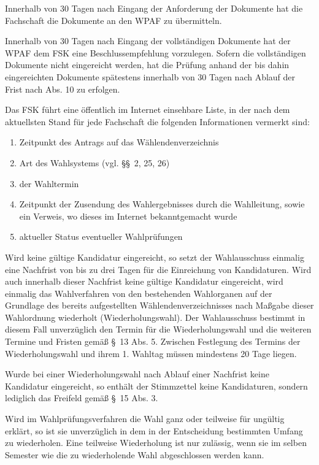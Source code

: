 \documentclass[%
draft,%
multilinesections%
]{fswo}
\begin{document}
\begin{contract}
Innerhalb von 30 Tagen nach Eingang der Anforderung der Dokumente hat die Fachschaft die Dokumente an den WPAF zu übermitteln.

Innerhalb von 30 Tagen nach Eingang der vollständigen Dokumente hat der WPAF dem FSK eine Beschlussempfehlung vorzulegen.
Sofern die vollständigen Dokumente nicht eingereicht werden, hat die Prüfung anhand der bis dahin eingereichten Dokumente spätestens innerhalb von 30 Tagen nach Ablauf der Frist nach Abs. 10 zu erfolgen.

Das FSK führt eine öffentlich im Internet einsehbare Liste, in der nach dem aktuellsten Stand für jede Fachschaft die folgenden Informationen vermerkt sind:
\begin{enumerate}
\item Zeitpunkt des Antrags auf das Wählendenverzeichnis
\item Art des Wahlsystems (vgl. \S\S~2, 25, 26) %
\item der Wahltermin
\item Zeitpunkt der Zusendung des Wahlergebnisses durch die Wahlleitung, sowie ein Verweis, wo dieses im Internet bekanntgemacht wurde
\item aktueller Status eventueller Wahlprüfungen
\end{enumerate}

Wird keine gültige Kandidatur eingereicht, so setzt der Wahlausschuss einmalig eine Nachfrist von bis zu drei Tagen für die Einreichung von Kandidaturen.
Wird auch innerhalb dieser Nachfrist keine gültige Kandidatur eingereicht, wird einmalig das Wahlverfahren von den bestehenden Wahlorganen auf der Grundlage des bereits aufgestellten Wählendenverzeichnisses nach Maßgabe dieser Wahlordnung wiederholt (Wiederholungswahl).
Der Wahlausschuss bestimmt in diesem Fall unverzüglich den Termin für die Wiederholungswahl und die weiteren Termine und Fristen gemäß \S~13 Abs. 5.
Zwischen Festlegung des Termins der Wiederholungswahl und ihrem 1. Wahltag müssen mindestens 20 Tage liegen.

Wurde bei einer Wiederholungswahl nach Ablauf einer Nachfrist keine Kandidatur eingereicht, so enthält der Stimmzettel keine Kandidaturen, sondern lediglich das Freifeld gemäß \S~15 Abs. 3. %

Wird im Wahlprüfungsverfahren die Wahl ganz oder teilweise für ungültig erklärt, so ist sie unverzüglich in dem in der Entscheidung bestimmten Umfang zu wiederholen.
Eine teilweise Wiederholung ist nur zulässig, wenn sie im selben Semester wie die zu wiederholende Wahl abgeschlossen werden kann.


\end{contract}
\end{document}
